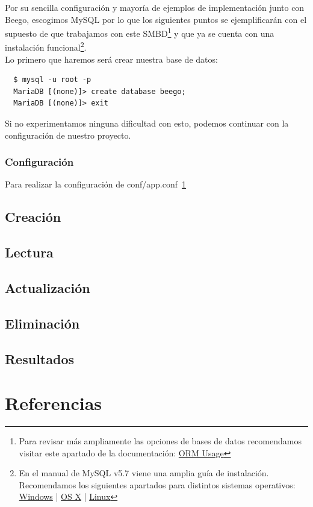 \documentclass[12pt]{article}
\begin{document}
Por su sencilla configuración y mayoría de ejemplos de implementación junto con
Beego, escogimos MySQL por lo que los siguientes puntos se ejemplificarán
con el supuesto de que trabajamos con este SMBD\footnote{Para revisar más ampliamente
  las opciones de bases de datos recomendamos visitar este apartado de la documentación:
  \href{http://beego.me/docs/mvc/model/orm.md#set-up-database}{ORM Usage}} y que ya se cuenta con una instalación
funcional\footnote{En el manual de MySQL v5.7 viene una amplia guía de instalación.
  Recomendamos los siguientes apartados para distintos sistemas operativos:
  \href{http://dev.mysql.com/doc/refman/5.7/en/windows-installation.html}{Windows} |
  \href{http://dev.mysql.com/doc/refman/5.7/en/osx-installation.html}{OS X} |
  \href{http://dev.mysql.com/doc/refman/5.7/en/linux-installation.html}{Linux}}.\\[2mm]
Lo primero que haremos será crear nuestra base de datos:
\begin{verbatim}
  $ mysql -u root -p
  MariaDB [(none)]> create database beego;
  MariaDB [(none)]> exit
\end{verbatim}
Si no experimentamos ninguna dificultad con esto, podemos continuar con la
configuración de nuestro proyecto.
\subsubsection*{Configuración}
Para realizar la configuración de conf/app.conf~\ref{}

\subsection{Creación}

\subsubsection*{}

\subsection{Lectura}

\subsection{Actualización}

\subsection{Eliminación}

\subsection{Resultados}

\section{Referencias}
\end{document}
